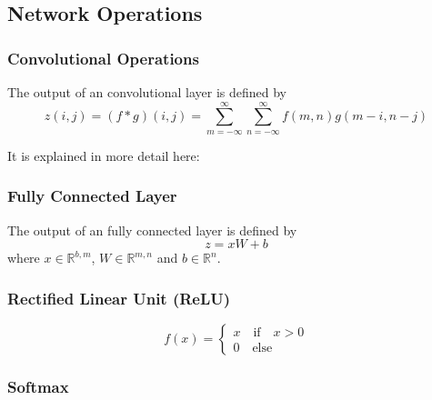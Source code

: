 \subsection{Network Operations}
\subsubsection*{Convolutional Operations}

The output of an convolutional layer is defined by
\begin{equation}
   z(i,j) = (f*g)(i,j) = \sum_{m=-\infty}^{\infty} \sum_{n=-\infty}^{\infty} f(m,n) g(m-i,n-j)
\end{equation}

It is explained in more detail here: \cite{dumoulin2016guide}

\subsubsection*{Fully Connected Layer}

The output of an fully connected layer is defined by
\begin{equation}
	z = xW + b
\end{equation}
where $x \in \mathbb{R}^{b,m}$,  $W \in \mathbb{R}^{m,n}$ and $b \in \mathbb{R}^{n}$. 

\subsubsection*{Rectified Linear Unit (ReLU)}

\begin{equation}
	f(x) = \begin{cases}
		x \quad \text{if} \quad x > 0 \\
		0 \quad \text{else}
	\end{cases}
\end{equation}


\subsubsection*{Softmax}
